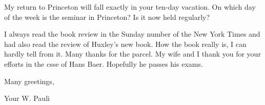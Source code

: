My return to Princeton will fall exactly in your ten-day vacation. On which day of the week is the seminar in Princeton? Is it now held regularly?

I always read the book review in the Sunday number of the New York Times and had also read the review of Huxley's new book. How the book really is, I can hardly tell from it. Many thanks for the parcel. My wife and I thank you for your efforts in the csse of Hans Baer. Hopefully he passes his exams.

Many greetings,

Your W. Pauli

